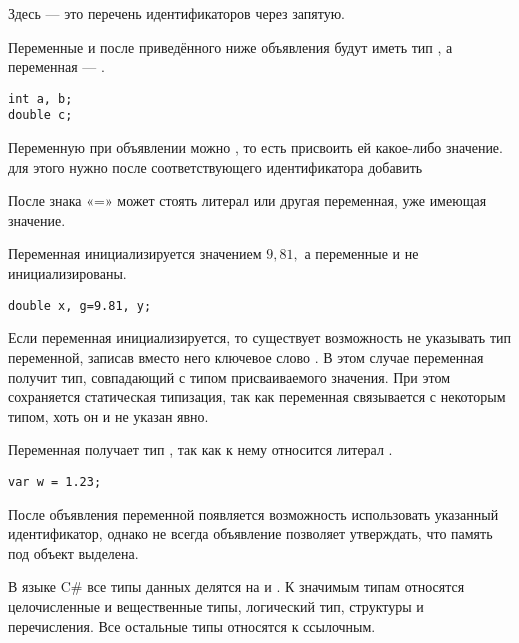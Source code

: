 Здесь  — это перечень
идентификаторов через запятую.

\begin{example}
  Переменные  и  после приведённого ниже
  объявления будут иметь тип , а переменная  —
  .
\begin{lstlisting}
int a, b;
double c;
\end{lstlisting}
\end{example}

Переменную при объявлении можно
, то есть присвоить ей
какое-либо значение. для этого нужно после соответствующего
идентификатора добавить

\begin{center}
  \Lst{= }
\par\end{center}

После знака «=» может стоять литерал или другая переменная, уже имеющая
значение.

\begin{example}
  Переменная  инициализируется значением $9{,}81,$ а
  переменные  и  не инициализированы.

\begin{lstlisting}
double x, g=9.81, y;
\end{lstlisting}
\end{example}

Если переменная инициализируется, то существует возможность не
указывать тип переменной, записав вместо него ключевое слово
. В этом случае переменная получит тип, совпадающий с
типом присваиваемого значения. При этом сохраняется статическая
типизация, так как переменная связывается с некоторым типом, хоть он и
не указан явно.

\begin{example}
Переменная  получает тип , так как к нему
относится литерал .

\begin{lstlisting}
var w = 1.23;
\end{lstlisting}
\end{example}

После объявления переменной появляется возможность использовать
указанный идентификатор, однако не всегда объявление позволяет
утверждать, что память под объект выделена.

В языке C\# все типы данных делятся на  и .
К значимым типам относятся целочисленные и вещественные типы,
логический тип, структуры и перечисления. Все остальные типы относятся
к ссылочным.

